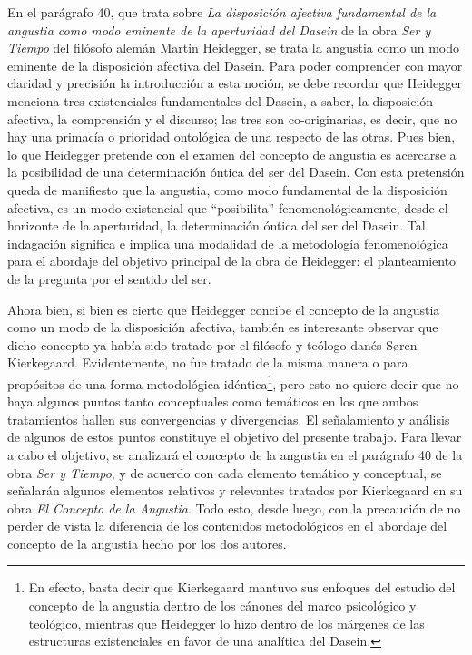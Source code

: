 \begin{refsection}

En el parágrafo 40, que trata sobre \emph{La disposición afectiva fundamental de la angustia como modo eminente de la aperturidad del Dasein} de la obra \emph{Ser y Tiempo} del filósofo alemán Martin Heidegger, se trata la angustia como un modo eminente de la disposición afectiva del Dasein. Para poder comprender con mayor claridad y precisión la introducción a esta noción, se debe recordar que Heidegger menciona tres existenciales fundamentales del Dasein, a saber, la disposición afectiva, la comprensión y el discurso; las tres son co-originarias, es decir, que no hay una primacía o prioridad ontológica de una respecto de las otras. Pues bien, lo que Heidegger pretende con el examen del concepto de angustia es acercarse a la posibilidad de una determinación óntica del ser del Dasein. Con esta pretensión queda de manifiesto que la angustia, como modo fundamental de la disposición afectiva, es un modo existencial que ``posibilita'' fenomenológicamente, desde el horizonte de la aperturidad, la determinación óntica del ser del Dasein. Tal indagación significa e implica una modalidad de la metodología fenomenológica para el abordaje del objetivo principal de la obra de Heidegger: el planteamiento de la pregunta por el sentido del ser.

Ahora bien, si bien es cierto que Heidegger concibe el concepto de la angustia como un modo de la disposición afectiva, también es interesante observar que dicho concepto ya había sido tratado por el filósofo y teólogo danés Søren Kierkegaard. Evidentemente, no fue tratado de la misma manera o para propósitos de una forma metodológica idéntica\footnote{En efecto, basta decir que Kierkegaard mantuvo sus enfoques del estudio del concepto de la angustia dentro de los cánones del marco psicológico y teológico, mientras que Heidegger lo hizo dentro de los márgenes de las estructuras existenciales en favor de una analítica del Dasein.}, pero esto no quiere decir que no haya algunos puntos tanto conceptuales como temáticos en los que ambos tratamientos hallen sus convergencias y divergencias. El señalamiento y análisis de algunos de estos puntos constituye el objetivo del presente trabajo. Para llevar a cabo el objetivo, se analizará el concepto de la angustia en el parágrafo 40 de la obra \emph{Ser y Tiempo}, y de acuerdo con cada elemento temático y conceptual, se señalarán algunos elementos relativos y relevantes tratados por Kierkegaard en su obra \emph{El Concepto de la Angustia}. Todo esto, desde luego, con la precaución de no perder de vista la diferencia de los contenidos metodológicos en el abordaje del concepto de la angustia hecho por los dos autores.


\end{refsection}

